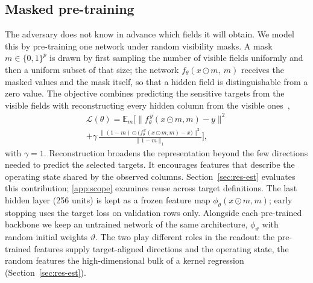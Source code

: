 \subsection{Masked pre-training}
The adversary does not know in advance which fields it will obtain. We model this by
pre-training one network under random visibility masks. A mask $m\in\{0,1\}^{p}$ is drawn by
first sampling the number of visible fields uniformly and then a uniform subset of that size;
the network $f_\theta(x\odot m,\ m)$ receives the masked values and the mask itself, so that a
hidden field is distinguishable from a zero value. The objective combines predicting the sensitive targets from the visible fields with reconstructing every hidden column
from the visible ones~\cite{yoon2020vime,he2022mae},
\begin{multline}\label{eq:pretrain}
\mathcal L(\theta)=\mathbb{E}_{m}\Big[\big\|f^{\,y}_\theta(x\odot m,m)-y\big\|^2\\
+\gamma\,\frac{\big\|(1-m)\odot\big(f^{\,x}_\theta(x\odot m,m)-x\big)\big\|^2}{\|1-m\|_1}\Big],
\end{multline}
with $\gamma=1$. Reconstruction broadens the representation beyond the few directions needed to predict the selected targets. It encourages features that describe the operating state shared by the observed columns. Section~\ref{sec:res-est} evaluates this contribution; \ref{app:scope} examines reuse across target definitions. The last hidden layer (256 units) is kept as a frozen feature map
$\phi_\theta(x\odot m, m)$; early stopping uses the target loss on validation rows only. Alongside each pre-trained backbone
we keep an untrained network of the same architecture, $\phi_{\vartheta}$ with random initial weights $\vartheta$. The two
play different roles in the readout: the pre-trained features supply target-aligned directions and the operating state, the
random features the high-dimensional bulk of a kernel regression~\cite{rahimi2007random} (Section~\ref{sec:res-est}).

